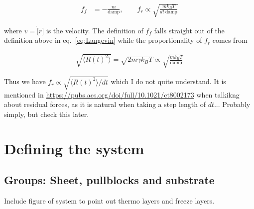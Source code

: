 \begin{align*}
  f_f &= -\frac{m}{\text{damp}}, \qquad 
  f_r \propto \sqrt{\frac{m k_B T}{dt \ \text{damp}}}
\end{align*}

where $v = \dot[r]$ is the velocity. The definition of $f_f$ falls straight out of the definition above in eq.~\eqref{eq:Langevin} while the proportionality of $f_r$ comes from

\begin{align*}
  \sqrt{\langle R(t)^2 \rangle} = \sqrt{2m\gamma k_B T} \propto \sqrt{\frac{m k_B T}{\text{damp}}} 
\end{align*}

Thus we have $f_r \propto \sqrt{\langle R(t)^2 \rangle / dt}$ which I do not quite understand. It is mentioned in \url{https://pubs.acs.org/doi/full/10.1021/ct8002173} when talkikng about residual forces, as it is natural when taking a step length of $dt$... Probably simply, but check this later.


\section{Defining the system}

\subsection{Groups: Sheet, pullblocks and substrate}
Include figure of system to point out thermo layers and freeze layers.


